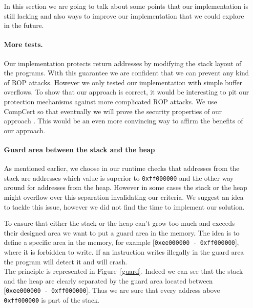 \documentclass[11pt]{sdm}
\begin{document}
In this section we are going to talk about some points that our implementation is still lacking and also ways to improve our implementation that we could explore in the future.

\paragraph{More tests.}
\label{par:More tests}
Our implementation protects return addresses by modifying the stack layout of the programs. With this guarantee we are confident that we can prevent any kind of ROP attacks. 
However we only tested our implementation with simple buffer overflows. To show that our approach is correct, it would be interesting to pit our protection mechanisms against more complicated ROP attacks. We use CompCert so that eventually we will prove the security properties of our approach . This would be an even more convincing way to affirm the benefits of our approach.


\paragraph{Guard area between the stack and the heap}
\label{par:guard_area}
As mentioned earlier, we choose in our runtime checks that addresses from the stack are addresses which value is superior to \texttt{0xff000000} and the other way around for addresses from the heap. However in some cases the stack or the heap might overflow over this separation invalidating our criteria.
We suggest an idea to tackle this issue, however we did not find the time to implement our solution.

To ensure that either the stack or the heap can't grow too much and exceeds their designed area we want to put a guard area in the memory. The idea is to define a specific area in the memory, for example [\texttt{0xee000000 - \texttt{0xff000000}}], where it is forbidden to write. If an instruction writes illegally in the guard area the program will detect it and will crash.\\
The principle is represented in Figure~\ref{guard}. Indeed we can see that the stack and the heap are clearly separated by the guard area located between [\texttt{0xee000000 - \texttt{0xff000000}}]. Thus we are sure that every address above \texttt{0xff000000} is part of the stack.
\end{document}
